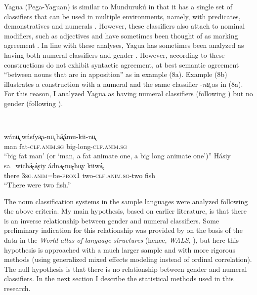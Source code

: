 \documentclass[output=collectionpaper]{langsci/langscibook}
\begin{document}
Yagua (Pega-Yaguan) is similar to Mundurukú in that it has a single set of classifiers that can be used in multiple environments, namely, with predicates, demonstratives and numerals \citep{Payne2007}. However, these classifiers also attach to nominal modifiers, such as adjectives and have sometimes been thought of as marking agreement \citep[217]{Aikhenvald2000}. In line with these analyses, Yagua has sometimes been analyzed as having both numeral classifiers and gender \citep[136--137]{Nichols1992}. However, according to \citet{Payne2007} these constructions do not exhibit syntactic agreement, at best semantic agreement ``between nouns that are in apposition'' as in example (8a). Example (8b) illustrates a construction with a numeral and the same classifier -\textit{nu̢} as in (8a). For this reason, I analyzed Yagua as having numeral classifiers (following \citealt{Gil2013}) but no gender (following \citealt{Payne2007}).

\ea
\label{ex:Sinne:8}
\\
\begin{xlist}
\ex
\gll wánu̢ wásíya̢̢a-nu̢ há̢ámu-kii-nu̢\\
man fat-\textsc{clf.anim.sg} big-long\textsc{{}-clf.anim.sg}\\
\glt ``big fat man' (or `man, a fat animate one, a big long animate one')''
\ex
\gll Hásiy sa=wichá̢-á̢siy ádna̢̢-nu̢-hu̢y kiiwá̢.\\
there 3\textsc{sg.anim}=be-\textsc{prox1} two-\textsc{clf.anim.sg}{}-two fish\\
\glt ``There were two fish.''\\
\end{xlist}
\z

The noun classification systems in the sample languages were analyzed following the above criteria. My main hypothesis, based on earlier literature, is that there is an inverse relationship between gender and numeral classifiers. Some preliminary indication for this relationship was provided by \citet[188--189]{Sinnemaeki2014a} on the basis of the data in the \textit{World atlas of language structures} (hence, \textit{WALS}, \citealt{Dryer2013}), but here this hypothesis is approached with a much larger sample and with more rigorous methods (using generalized mixed effects modeling instead of ordinal correlation). The null hypothesis is that there is no relationship between gender and numeral classifiers. In the next section I describe the statistical methods used in this research.
\end{document}
